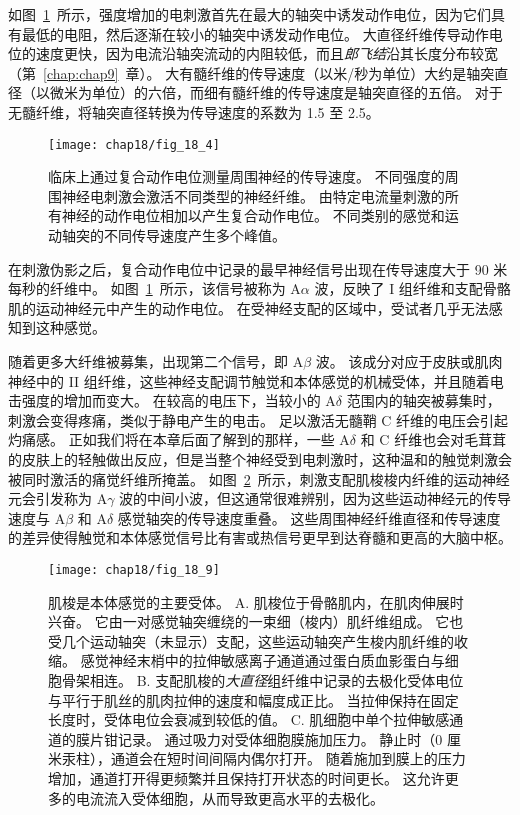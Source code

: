 如图~\ref{fig:18_4}~所示，强度增加的电刺激首先在最大的轴突中诱发动作电位，因为它们具有最低的电阻，然后逐渐在较小的轴突中诱发动作电位。
大直径纤维传导动作电位的速度更快，因为电流沿轴突流动的内阻较低，而且\textit{郎飞结}沿其长度分布较宽（第~\ref{chap:chap9}~章）。
大有髓纤维的传导速度（以米/秒为单位）大约是轴突直径（以微米为单位）的六倍，而细有髓纤维的传导速度是轴突直径的五倍。
对于无髓纤维，将轴突直径转换为传导速度的系数为 1.5 至 2.5。


\begin{figure}[htbp]
	\centering
	\texttt{[image: chap18/fig\_18\_4]}
	\caption{临床上通过复合动作电位测量周围神经的传导速度。
		不同强度的周围神经电刺激会激活不同类型的神经纤维。
		由特定电流量刺激的所有神经的动作电位相加以产生复合动作电位。
		不同类别的感觉和运动轴突的不同传导速度产生多个峰值\cite{erlanger2016electrical}。}
	\label{fig:18_4}
\end{figure}


在刺激伪影之后，复合动作电位中记录的最早神经信号出现在传导速度大于 90 米每秒的纤维中。
如图~\ref{fig:18_4}~所示，该信号被称为 A$\alpha$ 波，反映了 I 组纤维和支配骨骼肌的运动神经元中产生的动作电位。
在受神经支配的区域中，受试者几乎无法感知到这种感觉。


随着更多大纤维被募集，出现第二个信号，即 A$\beta$ 波。
该成分对应于皮肤或肌肉神经中的 II 组纤维，这些神经支配调节触觉和本体感觉的机械受体，并且随着电击强度的增加而变大。
在较高的电压下，当较小的 A$\delta$ 范围内的轴突被募集时，刺激会变得疼痛，类似于静电产生的电击。
足以激活无髓鞘 C 纤维的电压会引起灼痛感。
正如我们将在本章后面了解到的那样，一些 A$\delta$ 和 C 纤维也会对毛茸茸的皮肤上的轻触做出反应，但是当整个神经受到电刺激时，这种温和的触觉刺激会被同时激活的痛觉纤维所掩盖。
如图~\ref{fig:18_9}~所示，刺激支配肌梭梭内纤维的运动神经元会引发称为 A$\gamma$ 波的中间小波，但这通常很难辨别，因为这些运动神经元的传导速度与 A$\beta$ 和 A$\delta$ 感觉轴突的传导速度重叠。
这些周围神经纤维直径和传导速度的差异使得触觉和本体感觉信号比有害或热信号更早到达脊髓和更高的大脑中枢。


\begin{figure}[htbp]
	\centering
	\texttt{[image: chap18/fig\_18\_9]}
	\caption{肌梭是本体感觉的主要受体。
		A. 肌梭位于骨骼肌内，在肌肉伸展时兴奋。
		它由一对感觉轴突缠绕的一束细（梭内）肌纤维组成。
		它也受几个运动轴突（未显示）支配，这些运动轴突产生梭内肌纤维的收缩。
		感觉神经末梢中的拉伸敏感离子通道通过蛋白质血影蛋白与细胞骨架相连\cite{sachs1992stretch}。
		B. 支配肌梭的\textit{大直径}组纤维中记录的去极化受体电位与平行于肌丝的肌肉拉伸的速度和幅度成正比。 
		当拉伸保持在固定长度时，受体电位会衰减到较低的值\cite{cone1971transducer}。
		C. 肌细胞中单个拉伸敏感通道的膜片钳记录。
		通过吸力对受体细胞膜施加压力。
		静止时（0 厘米汞柱），通道会在短时间间隔内偶尔打开。 
		随着施加到膜上的压力增加，通道打开得更频繁并且保持打开状态的时间更长。
		这允许更多的电流流入受体细胞，从而导致更高水平的去极化\cite{guharay1984stretch}。}
	\label{fig:18_9}
\end{figure}


